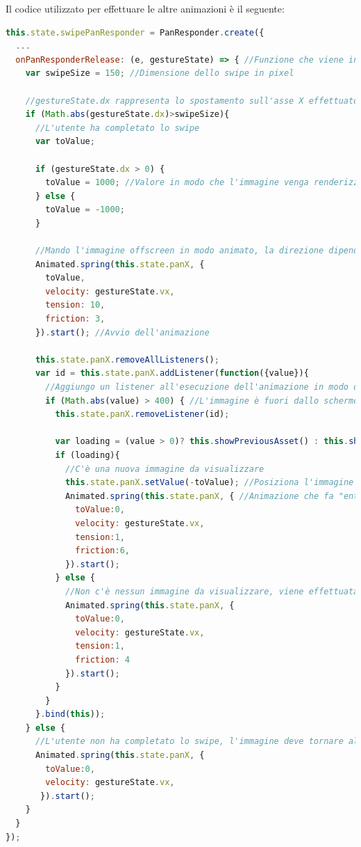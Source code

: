 Il codice utilizzato per effettuare le altre animazioni è il seguente:
\begin{lstlisting}[language=JavaScript, caption=AssetDetailPage - Animazione dello swipe]
this.state.swipePanResponder = PanResponder.create({
  ...
  onPanResponderRelease: (e, gestureState) => { //Funzione che viene invocata quando l'utente termina la gesture
    var swipeSize = 150; //Dimensione dello swipe in pixel
    
    //gestureState.dx rappresenta lo spostamento sull'asse X effettuato dall'utente
    if (Math.abs(gestureState.dx)>swipeSize){
      //L'utente ha completato lo swipe
      var toValue;
      
      if (gestureState.dx > 0) {
        toValue = 1000; //Valore in modo che l'immagine venga renderizzata offscreen
      } else {
        toValue = -1000;
      }
     
      //Mando l'immagine offscreen in modo animato, la direzione dipende dalla direzione della gesture (segno di gestureState.dx)
      Animated.spring(this.state.panX, {
        toValue,
        velocity: gestureState.vx,
        tension: 10,
        friction: 3,
      }).start(); //Avvio dell'animazione
      
      this.state.panX.removeAllListeners();
      var id = this.state.panX.addListener(function({value}){ 
      	//Aggiungo un listener all'esecuzione dell'animazione in modo di riuscire a capire quando l'immagine è finita fuori dallo schermo
        if (Math.abs(value) > 400) { //L'immagine è fuori dallo schermo
          this.state.panX.removeListener(id);
          
          var loading = (value > 0)? this.showPreviousAsset() : this.showNextAsset();
          if (loading){
            //C'è una nuova immagine da visualizzare
            this.state.panX.setValue(-toValue); //Posiziona l'immagine dalla parte opposta dello schermo
            Animated.spring(this.state.panX, { //Animazione che fa "entrare" la nuova immagine dalla parte opposta dello schermo
              toValue:0,
              velocity: gestureState.vx,
              tension:1,
              friction:6,
            }).start();
          } else {
          	//Non c'è nessun immagine da visualizzare, viene effettuata l'animazione che riporta l'immagine alla posizione iniziale
            Animated.spring(this.state.panX, {
              toValue:0,
              velocity: gestureState.vx,
              tension:1,
              friction: 4
            }).start();
          }
        }
      }.bind(this));
    } else {
      //L'utente non ha completato lo swipe, l'immagine deve tornare alla posizione iniziale in modo animato
      Animated.spring(this.state.panX, {
        toValue:0,
        velocity: gestureState.vx,
       }).start();
    }
  }
});
\end{lstlisting}

